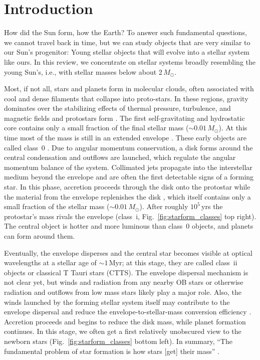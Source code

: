 \section{Introduction}
How did the Sun form, how the Earth? To answer such fundamental questions, we cannot travel back in time, but we can study objects that are very similar to our Sun's progenitor: Young stellar objects that will evolve into a stellar system like ours. In this review, we concentrate on stellar systems broadly resembling the young Sun's, i.e., with stellar masses below about 2$\,M_\odot$.

Most, if not all, stars and planets form in molecular clouds, often associated with cool and dense filaments that collapse into proto-stars. In these regions, gravity dominates over the stabilizing effects of thermal pressure, turbulence, and magnetic fields \citep[e.g., ][]{McKee_2007} and protostars form  \citep{Andre_2014}. The first self-gravitating and hydrostatic core contains only a small fraction of the final stellar mass ($\sim0.01\,M_\odot$). At this time most of the mass is still in an extended envelope \citep[e.g.,][]{Gong_2015,Lee_2020}. These early objects are called class~0 \citep[see Fig.~\ref{fig:starform_classes} top left, and ][]{Andre_1993, Larson_2003}. Due to angular momentum conservation, a disk forms around the central condensation and outflows are launched, which regulate the angular momentum balance of the system. Collimated jets propagate into the interstellar medium beyond the envelope and are often the first detectable signs of a forming star. In this phase, accretion proceeds through the disk onto the protostar while the material from the envelope replenishes the disk \citep{Padoan_2014}, which itself contains only a small fraction of the stellar mass ($\sim0.01\,M_\odot$). After roughly $10^5$\,yrs the protostar's mass rivals the envelope (class~{\sc i}, Fig.~\ref{fig:starform_classes} top right). The central object is hotter and more luminous than class~0 objects, and planets can form around them.

Eventually, the envelope disperses and the central star becomes visible at optical wavelengths at a stellar age of $\sim1\,$Myr; at this stage, they are called class~{\sc ii} objects or classical T Tauri stars (CTTS). The envelope dispersal mechanism is not clear yet, but winds and radiation from any nearby OB stars or otherwise radiation and outflows from low mass stars likely play a major role. Also, the winds launched by the forming stellar system itself may contribute to the envelope dispersal and reduce the envelope-to-stellar-mass conversion efficiency \citep{Frank_2014}. Accretion proceeds and begins to reduce the disk mass, while planet formation continues. In this stage,  we often get a first relatively unobscured view to the newborn stars (Fig.~\ref{fig:starform_classes} bottom left). In summary, ``The fundamental problem of star formation is how stars [get] their mass'' \citep{Dunham_2014}.


